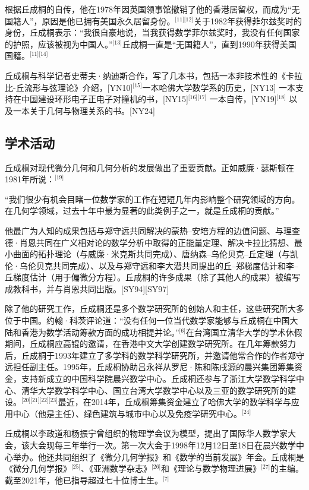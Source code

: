 根据丘成桐的自传，他在1978年因英国领事馆撤销了他的香港居留权，而成为“无国籍人”，原因是他已拥有美国永久居留身份。\(^\text{[11][12]}\)关于1982年获得菲尔兹奖时的身份，丘成桐表示：“我很自豪地说，当我获得数学菲尔兹奖时，我没有任何国家的护照，应该被视为中国人。”\(^\text{[13]}\)丘成桐一直是“无国籍人”，直到1990年获得美国国籍。\(^\text{[11][14]}\)

丘成桐与科学记者史蒂夫·纳迪斯合作，写了几本书，包括一本非技术性的《卡拉比-丘流形与弦理论》介绍，[YN10]\(^\text{[15]}\)一本哈佛大学数学系的历史，[NY13] 一本支持在中国建设环形电子正电子对撞机的书，[NY15]\(^\text{[16][17]}\) 一本自传，[YN19]\(^\text{[18]}\) 以及一本关于几何与物理关系的书。[NY24]
\subsection{学术活动}  
丘成桐对现代微分几何和几何分析的发展做出了重要贡献。正如威廉·瑟斯顿在1981年所说：\(^\text{[19]}\)

“我们很少有机会目睹一位数学家的工作在短短几年内影响整个研究领域的方向。在几何学领域，过去十年中最为显著的此类例子之一，就是丘成桐的贡献。”

他最广为人知的成果包括与郑守远共同解决的蒙热–安培方程的边值问题、与理查德·肖恩共同在广义相对论的数学分析中取得的正能量定理、解决卡拉比猜想、最小曲面的拓扑理论（与威廉·米克斯共同完成）、唐纳森–乌伦贝克–丘定理（与凯伦·乌伦贝克共同完成）、以及与郑守远和李大潜共同提出的丘–郑梯度估计和李–丘梯度估计（用于偏微分方程）。丘成桐的许多成果（除了其他人的成果）被编写成教科书，并与肖恩共同出版。[SY94][SY97]

除了他的研究工作，丘成桐还是多个数学研究所的创始人和主任，这些研究所大多位于中国。约翰·科茨评论道：“没有任何一位当代数学家能够与丘成桐在中国大陆和香港为数学活动筹款方面的成功相提并论。”\(^\text{[6]}\)在台湾国立清华大学的学术休假期间，丘成桐应高锟的邀请，在香港中文大学创建数学研究所。在几年筹款努力后，丘成桐于1993年建立了多学科的数学科学研究所，并邀请他常合作的作者郑守远担任副主任。1995年，丘成桐协助吕永祥从罗尼·陈和陈戌源的晨兴集团筹集资金，支持新成立的中国科学院晨兴数学中心。丘成桐还参与了浙江大学数学科学中心、清华大学数学科学中心、国立台湾大学数学中心以及三亚的数学研究所的建设。\(^\text{[20][21][22][23]}\)最近，在2014年，丘成桐筹集资金建立了哈佛大学的数学科学与应用中心（他是主任）、绿色建筑与城市中心以及免疫学研究中心。\(^\text{[24]}\)

丘成桐以李政道和杨振宁曾组织的物理学会议为模型，提出了国际华人数学家大会，该大会现每三年举行一次。第一次大会于1998年12月12日至18日在晨兴数学中心举办。他还共同组织了《微分几何学报》和《数学的当前发展》年会。丘成桐是《微分几何学报》\(^\text{[25]}\)、《亚洲数学杂志》\(^\text{[26]}\)和《理论与数学物理进展》\(^\text{[27]}\)的主编。截至2021年，他已指导超过七十位博士生。\(^\text{[7]}\)


